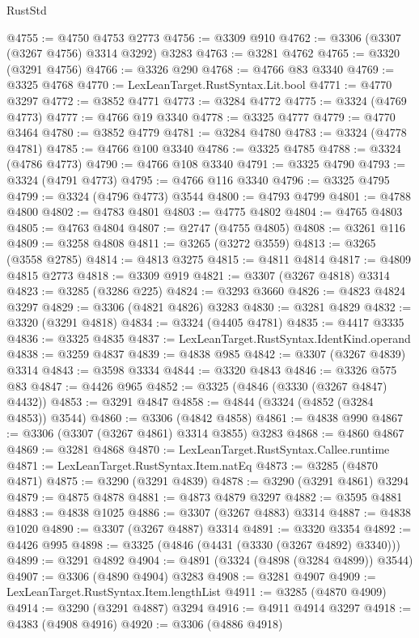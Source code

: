 \begin{lexlean}{RustStd}
\begin{coremodule}
@4755 := @4750 @4753 @2773
@4756 := @3309 @910
@4762 := @3306 (@3307 (@3267 @4756) @3314 @3292) @3283
@4763 := @3281 @4762
@4765 := @3320 (@3291 @4756)
@4766 := @3326 @290
@4768 := @4766 @83 @3340
@4769 := @3325 @4768
@4770 := LexLeanTarget.RustSyntax.Lit.bool
@4771 := @4770 @3297
@4772 := @3852 @4771
@4773 := @3284 @4772
@4775 := @3324 (@4769 @4773)
@4777 := @4766 @19 @3340
@4778 := @3325 @4777
@4779 := @4770 @3464
@4780 := @3852 @4779
@4781 := @3284 @4780
@4783 := @3324 (@4778 @4781)
@4785 := @4766 @100 @3340
@4786 := @3325 @4785
@4788 := @3324 (@4786 @4773)
@4790 := @4766 @108 @3340
@4791 := @3325 @4790
@4793 := @3324 (@4791 @4773)
@4795 := @4766 @116 @3340
@4796 := @3325 @4795
@4799 := @3324 (@4796 @4773) @3544
@4800 := @4793 @4799
@4801 := @4788 @4800
@4802 := @4783 @4801
@4803 := @4775 @4802
@4804 := @4765 @4803
@4805 := @4763 @4804
@4807 := @2747 (@4755 @4805)
@4808 := @3261 @116
@4809 := @3258 @4808
@4811 := @3265 (@3272 @3559)
@4813 := @3265 (@3558 @2785)
@4814 := @4813 @3275
@4815 := @4811 @4814
@4817 := @4809 @4815 @2773
@4818 := @3309 @919
@4821 := @3307 (@3267 @4818) @3314
@4823 := @3285 (@3286 @225)
@4824 := @3293 @3660
@4826 := @4823 @4824 @3297
@4829 := @3306 (@4821 @4826) @3283
@4830 := @3281 @4829
@4832 := @3320 (@3291 @4818)
@4834 := @3324 (@4405 @4781)
@4835 := @4417 @3335
@4836 := @3325 @4835
@4837 := LexLeanTarget.RustSyntax.IdentKind.operand
@4838 := @3259 @4837
@4839 := @4838 @985
@4842 := @3307 (@3267 @4839) @3314
@4843 := @3598 @3334
@4844 := @3320 @4843
@4846 := @3326 @575 @83
@4847 := @4426 @965
@4852 := @3325 (@4846 (@3330 (@3267 @4847) @4432))
@4853 := @3291 @4847
@4858 := @4844 (@3324 (@4852 (@3284 @4853)) @3544)
@4860 := @3306 (@4842 @4858)
@4861 := @4838 @990
@4867 := @3306 (@3307 (@3267 @4861) @3314 @3855) @3283
@4868 := @4860 @4867
@4869 := @3281 @4868
@4870 := LexLeanTarget.RustSyntax.Callee.runtime
@4871 := LexLeanTarget.RustSyntax.Item.natEq
@4873 := @3285 (@4870 @4871)
@4875 := @3290 (@3291 @4839)
@4878 := @3290 (@3291 @4861) @3294
@4879 := @4875 @4878
@4881 := @4873 @4879 @3297
@4882 := @3595 @4881
@4883 := @4838 @1025
@4886 := @3307 (@3267 @4883) @3314
@4887 := @4838 @1020
@4890 := @3307 (@3267 @4887) @3314
@4891 := @3320 @3354
@4892 := @4426 @995
@4898 := @3325 (@4846 (@4431 (@3330 (@3267 @4892) @3340)))
@4899 := @3291 @4892
@4904 := @4891 (@3324 (@4898 (@3284 @4899)) @3544)
@4907 := @3306 (@4890 @4904) @3283
@4908 := @3281 @4907
@4909 := LexLeanTarget.RustSyntax.Item.lengthList
@4911 := @3285 (@4870 @4909)
@4914 := @3290 (@3291 @4887) @3294
@4916 := @4911 @4914 @3297
@4918 := @4383 (@4908 @4916)
@4920 := @3306 (@4886 @4918)

\end{coremodule}
\end{lexlean}
